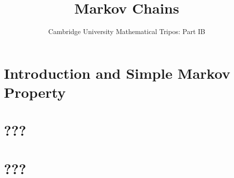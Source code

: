 \documentclass{article}
\title{Markov Chains}
\author{Cambridge University Mathematical Tripos: Part IB}
\begin{document}
\maketitle

\tableofcontentsnewpage{}

\section{Introduction and Simple Markov Property}

\section{???}

\section{???}

\end{document}
